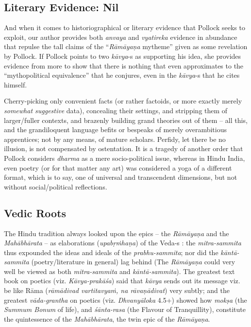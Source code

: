 \subsection*{Literary Evidence: Nil}

And when it comes to historiographical or literary evidence that Pollock seeks to exploit, our author provides both {\sl anvaya} and {\sl vyatireka} evidence in abundance that repulse the tall claims of  the “{\sl Rāmāyaṇa} mytheme” given as some revelation by Pollock. If Pollock points to two {\sl kāvya}-s as supporting his idea, she provides evidence from more to show that there is nothing that even approximates to the “mythopolitical equivalence” that he conjures, even in the {\sl kāvya}-s that he cites himself.

Cherry-picking only convenient facts (or rather factoids, or more exactly merely {\sl somewhat suggestive} data), concealing their settings, and stripping them of larger/fuller contexts, and brazenly building grand theories out of them -- all this, and the grandiloquent language befits or bespeaks of merely overambitious apprentices; not by any means, of mature scholars. Perfidy, let there be no illusion, is not compensated by ostentation. It is a tragedy of another order that Pollock considers {\sl dharma} as a mere socio-political issue, whereas in Hindu India, even poetry (or for that matter any art) was considered a yoga of a different format, which is to say, one of universal and transcendent dimensions, but not without social/political reflections.\\[-20pt] 

\subsection*{Vedic Roots}

The Hindu tradition always looked upon the epics -- the {\sl Rāmāyaṇa} and the {\sl Mahābhārata} -- as elaborations ({\sl upabṛṁhaṇa}) of the Veda-s : the {\sl mitra-sammita} thus expounded the ideas and ideals  of the {\sl prabhu-\break\-sammita}; nor did the {\sl kāntā-sammita} (poetry/literature in general) lag behind (The {\sl Rāmāyaṇa} could very well be viewed as both {\sl mitra-sammita} and {\sl kāntā-sammita}). The greatest text book on poetics (viz. {\sl Kāvya-prakāśa}) said that {\sl kāvya} sends out its message viz. be like Rāma ({\sl rāmādivad vartitavyaṁ, na rāvaṇādivat}) very subtly; and the greatest {\sl vāda-grantha} on poetics (viz. {\sl Dhvanyāloka} 4.5+) showed how {\sl mokṣa} (the {\sl Summum Bonum} of life), and {\sl śānta-rasa} (the Flavour of Tranquillity), constitute the quintessence of the {\sl Mahābhārata}, the twin epic of the {\sl Rāmāyaṇa}.\\[-20pt]

